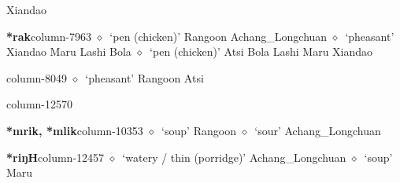          Xiandao 
  \item {\footnotesize \textbf{*rak}}{\tiny column-7963}
         $\diamond$~`pen (chicken)'
         Rangoon 
\hspace{1ex}
         Achang\_Longchuan 
\hspace{1ex}
         $\diamond$~`pheasant'
         Xiandao 
\hspace{1ex}
         Maru 
\hspace{1ex}
         Lashi 
\hspace{1ex}
         Bola 
\hspace{1ex}
         $\diamond$~`pen (chicken)'
         Atsi 
\hspace{1ex}
         Bola 
\hspace{1ex}
         Lashi 
\hspace{1ex}
         Maru 
\hspace{1ex}
         Xiandao 
  \item {\footnotesize \textbf{}}{\tiny column-8049}
         $\diamond$~`pheasant'
         Rangoon 
\hspace{1ex}
         Atsi 
  \item {\footnotesize \textbf{}}{\tiny column-12570}
  \item {\footnotesize \textbf{*mrik, *mlik}}{\tiny column-10353}
         $\diamond$~`soup'
         Rangoon 
\hspace{1ex}
         $\diamond$~`sour'
         Achang\_Longchuan 
  \item {\footnotesize \textbf{*riŋH}}{\tiny column-12457}
         $\diamond$~`watery / thin (porridge)'
         Achang\_Longchuan 
\hspace{1ex}
         $\diamond$~`soup'
         Maru 
\hspace{1ex}
